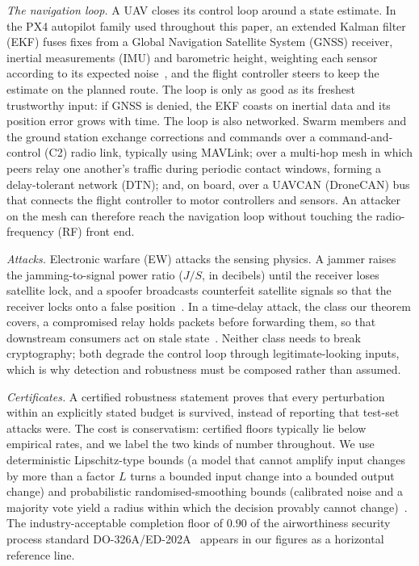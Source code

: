 \emph{The navigation loop.} A UAV closes its control loop around a state
estimate. In the PX4 autopilot family used throughout this paper, an extended
Kalman filter (EKF) fuses fixes from a Global Navigation Satellite System
(GNSS) receiver, inertial measurements (IMU) and barometric height, weighting
each sensor according to its expected noise~\cite{kong2024px4ekf}, and the
flight controller steers to keep the estimate on the planned route. The loop is
only as good as its freshest trustworthy input: if GNSS is denied, the EKF
coasts on inertial data and its position error grows with time. The loop is
also networked. Swarm members and the ground station exchange corrections and
commands over a command-and-control (C2) radio link, typically using MAVLink;
over a multi-hop mesh in which peers relay one another's traffic during
periodic contact windows, forming a delay-tolerant network (DTN); and, on board,
over a UAVCAN (DroneCAN) bus that connects the flight controller to motor
controllers and sensors. An attacker on the mesh can therefore reach the
navigation loop without touching the radio-frequency (RF) front end.

\emph{Attacks.} Electronic warfare (EW) attacks the sensing physics. A jammer
raises the jamming-to-signal power ratio ($J/S$, in decibels) until the
receiver loses satellite lock, and a spoofer broadcasts counterfeit satellite
signals so that the receiver locks onto a false
position~\cite{humphreys2008assessing,kerns2014capture}. In a time-delay
attack, the class our theorem covers, a compromised relay holds packets before
forwarding them, so that downstream consumers act on stale
state~\cite{lou2019timedelay,datamut2026}. Neither class needs to break
cryptography; both degrade the control loop through legitimate-looking inputs,
which is why detection and robustness must be composed rather than assumed.

\emph{Certificates.} A certified robustness statement proves that every
perturbation within an explicitly stated budget is survived, instead of
reporting that test-set attacks were. The cost is conservatism: certified
floors typically lie below empirical rates, and we label the two kinds of
number throughout. We use deterministic Lipschitz-type bounds (a model that
cannot amplify input changes by more than a factor $L$ turns a bounded input
change into a bounded output change) and probabilistic randomised-smoothing
bounds (calibrated noise and a majority vote yield a radius within which the
decision provably cannot change)~\cite{cohen2019smoothing}. The
industry-acceptable completion floor of $0.90$ of the airworthiness security
process standard DO-326A/ED-202A~\cite{do326a} appears in our figures as a
horizontal reference line.

